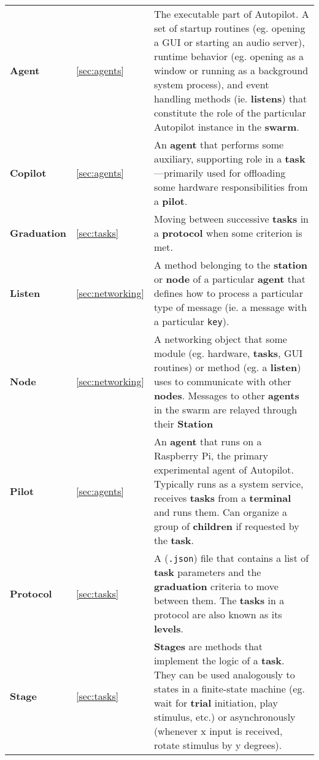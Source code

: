 \begin{fullwidth}
\renewcommand{\arraystretch}{1.25}
\begin{table*}[!hb]
\noindent\begin{tabularx}{\linewidth}{llX}

 \textbf{Agent} & \ref{sec:agents} & The executable part of Autopilot. A set of startup routines (eg. opening a GUI or starting an audio server), runtime behavior (eg. opening as a window or running as a background system process), and event handling methods (ie. \textbf{listens}) that constitute the role of the particular Autopilot instance in the \textbf{swarm}. \\
 \textbf{Copilot} & \ref{sec:agents} & An \textbf{agent} that performs some auxiliary, supporting role in a \textbf{task}---primarily used for offloading some hardware responsibilities from a \textbf{pilot}. \\
 \textbf{Graduation} & \ref{sec:tasks} & Moving between successive \textbf{tasks} in a \textbf{protocol} when some criterion is met.  \\
 \textbf{Listen} & \ref{sec:networking} & A method belonging to the \textbf{station} or \textbf{node} of a particular \textbf{agent} that defines how to process a particular type of message (ie. a message with a particular \texttt{key}). \\
 \textbf{Node} & \ref{sec:networking} & A networking object that some module (eg. hardware, \textbf{tasks}, GUI routines) or method (eg. a \textbf{listen}) uses to communicate with other \textbf{nodes}. Messages to other \textbf{agents} in the swarm are relayed through their \textbf{Station} \\
 \textbf{Pilot} & \ref{sec:agents} & An \textbf{agent} that runs on a Raspberry Pi, the primary experimental agent of Autopilot. Typically runs as a system service, receives \textbf{tasks} from a \textbf{terminal} and runs them. Can organize a group of \textbf{children} if requested by the \textbf{task}. \\
 \textbf{Protocol} & \ref{sec:tasks} & A (\texttt{.json}) file that contains a list of \textbf{task} parameters and the \textbf{graduation} criteria to move between them. The \textbf{tasks} in a protocol are also known as its \textbf{levels}.  \\
 \textbf{Stage} & \ref{sec:tasks} & \textbf{Stages} are methods that implement the logic of a \textbf{task}. They can be used analogously to states in a finite-state machine (eg. wait for \textbf{trial} initiation, play stimulus, etc.) or asynchronously (whenever x input is received, rotate stimulus by y degrees). \\

\end{tabularx}
\end{table*}
\end{fullwidth}
